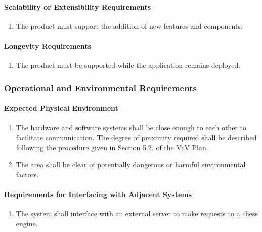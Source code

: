 \documentclass[12pt]{article}
\begin{document}
\paragraph{Scalability or Extensibility Requirements}
\begin{enumerate}[{PR}1., leftmargin=2\parindent, resume]
    \item The product must support the addition of new features and components.
\end{enumerate}

\paragraph{Longevity Requirements}
\begin{enumerate}[{PR}1., leftmargin=2\parindent, resume]
    \item The product must be supported while the application remains deployed.
\end{enumerate}



\subsubsection{Operational and Environmental Requirements}
\label{NFR_OE}
\paragraph{Expected Physical Environment}
\begin{enumerate}[{OE}1., leftmargin=2\parindent]
    \item The hardware and software systems shall be close enough to each other to facilitate communication. The degree of proximity required 
    shall be described following the procedure given in Section 5.2.\thevnvSectionNfr{} of the VnV Plan.
    \item The area shall be clear of potentially dangerous or harmful environmental factors.
\end{enumerate}

\paragraph{Requirements for Interfacing with Adjacent Systems}
\begin{enumerate}[{OE}1., leftmargin=2\parindent, resume]
    \item The system shall interface with an external server to make requests to a chess engine.
\end{enumerate}
\end{document}
